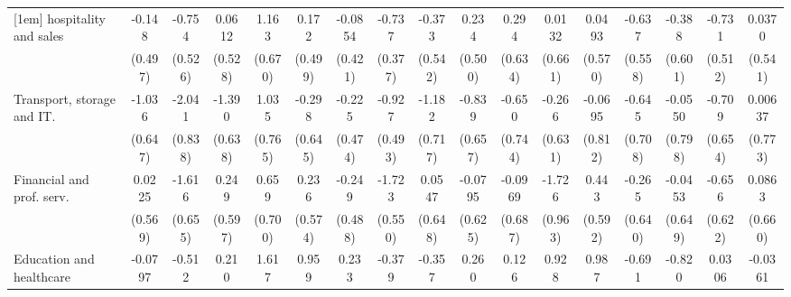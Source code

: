 {\begin{tabular}{l*{16}{c}}
[1em]
hospitality and sales&      -0.148         &      -0.754         &      0.0612         &       1.163         &       0.172         &     -0.0854         &      -0.737         &      -0.373         &       0.234         &       0.294         &      0.0132         &      0.0493         &      -0.637         &      -0.388         &      -0.731         &      0.0370         \\
                    &     (0.497)         &     (0.526)         &     (0.528)         &     (0.670)         &     (0.499)         &     (0.421)         &     (0.377)         &     (0.542)         &     (0.500)         &     (0.634)         &     (0.661)         &     (0.570)         &     (0.558)         &     (0.601)         &     (0.512)         &     (0.541)         \\
[1em]
Transport, storage and IT.&      -1.036         &      -2.041\sym{*}  &      -1.390\sym{*}  &       1.035         &      -0.298         &      -0.225         &      -0.927         &      -1.182         &      -0.839         &      -0.650         &      -0.266         &     -0.0695         &      -0.645         &     -0.0550         &      -0.709         &     0.00637         \\
                    &     (0.647)         &     (0.838)         &     (0.638)         &     (0.765)         &     (0.645)         &     (0.474)         &     (0.493)         &     (0.717)         &     (0.657)         &     (0.744)         &     (0.631)         &     (0.812)         &     (0.708)         &     (0.798)         &     (0.654)         &     (0.773)         \\
[1em]
Financial and prof. serv.&      0.0225         &      -1.616\sym{*}  &       0.249         &       0.659         &       0.236         &      -0.249         &      -1.723\sym{**} &      0.0547         &     -0.0795         &     -0.0969         &      -1.726         &       0.443         &      -0.265         &     -0.0453         &      -0.656         &      0.0863         \\
                    &     (0.569)         &     (0.655)         &     (0.597)         &     (0.700)         &     (0.574)         &     (0.488)         &     (0.550)         &     (0.648)         &     (0.625)         &     (0.687)         &     (0.963)         &     (0.592)         &     (0.640)         &     (0.649)         &     (0.622)         &     (0.660)         \\
[1em]
Education and healthcare&     -0.0797         &      -0.512         &       0.210         &       1.617\sym{*}  &       0.959         &       0.233         &      -0.379         &      -0.357         &       0.260         &       0.126         &       0.928         &       0.987         &      -0.691         &      -0.820         &      0.0306         &     -0.0361         \\

\end{tabular}}
